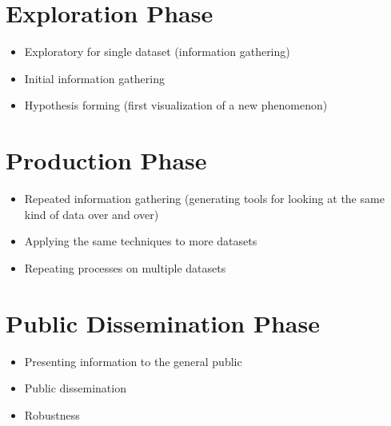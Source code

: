\section{Exploration Phase}
\begin{itemize}
\item Exploratory for single dataset (information gathering)
\item Initial information gathering
\item Hypothesis forming (first visualization of a new phenomenon)
\end{itemize}

\section{Production Phase}
\begin{itemize}
\item Repeated information gathering (generating tools for looking at the same kind of data over and over)
\item Applying the same techniques to more datasets
\item Repeating processes on multiple datasets
\end{itemize}

\section{Public Dissemination Phase}
\begin{itemize}
\item Presenting information to the general public
\item Public dissemination
\item Robustness
\end{itemize}

